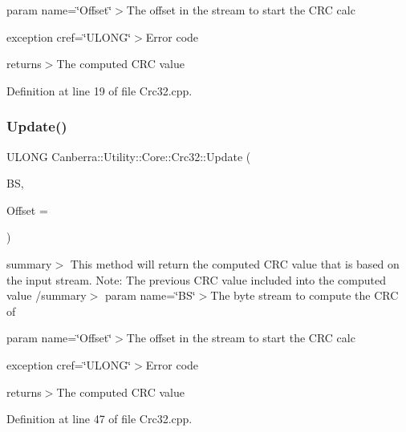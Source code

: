 param name=\char`\"{}\+Offset\char`\"{}$>$The offset in the stream to start the C\+RC calc 

exception cref=\char`\"{}\+U\+L\+O\+N\+G\char`\"{}$>$Error code

returns$>$The computed C\+RC value

Definition at line 19 of file Crc32.\+cpp.

\mbox{\label{class_canberra_1_1_utility_1_1_core_1_1_crc32_a35635a2cd95023d7b01ccb9133361c23_a35635a2cd95023d7b01ccb9133361c23}} 
\subsubsection{\texorpdfstring{Update()}{Update()}\hspace{0.1cm}{\footnotesize\ttfamily [1/2]}}
{\footnotesize\ttfamily U\+L\+O\+NG Canberra\+::\+Utility\+::\+Core\+::\+Crc32\+::\+Update (\begin{DoxyParamCaption}\item[{const \hyperlink{class_canberra_1_1_utility_1_1_core_1_1_byte_stream}{Byte\+Stream} \&}]{BS,  }\item[{L\+O\+NG}]{Offset = {} }\end{DoxyParamCaption})}

summary$>$ This method will return the computed C\+RC value that is based on the input stream. Note\+: The previous C\+RC value included into the computed value /summary$>$ param name=\char`\"{}\+B\+S\char`\"{}$>$The byte stream to compute the C\+RC of 

param name=\char`\"{}\+Offset\char`\"{}$>$The offset in the stream to start the C\+RC calc 

exception cref=\char`\"{}\+U\+L\+O\+N\+G\char`\"{}$>$Error code

returns$>$The computed C\+RC value

Definition at line 47 of file Crc32.\+cpp.

\mbox{\label{class_canberra_1_1_utility_1_1_core_1_1_crc32_a06b897033aec857f2f821ba48668b8e1_a06b897033aec857f2f821ba48668b8e1}} 
